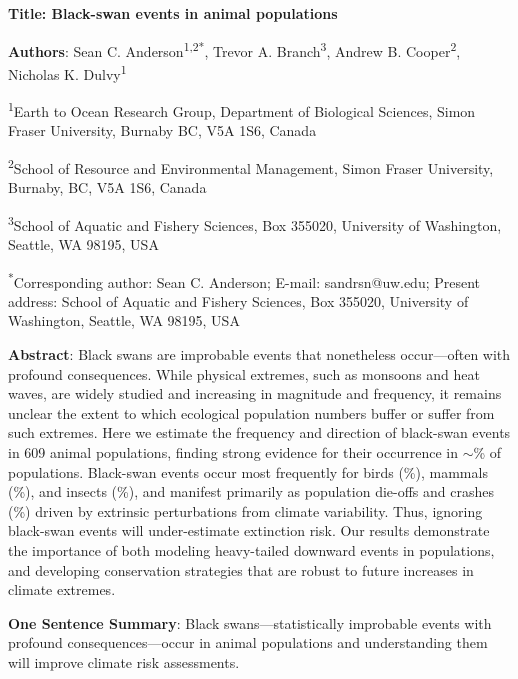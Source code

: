 \textbf{Title: Black-swan events in animal populations}

\textbf{Authors}: Sean C. Anderson\textsuperscript{1,2*}, Trevor A. Branch\textsuperscript{3}, Andrew B. Cooper\textsuperscript{2}, Nicholas K. Dulvy\textsuperscript{1}

\textsuperscript{1}Earth to Ocean Research Group, Department of Biological Sciences, Simon Fraser University, Burnaby BC, V5A 1S6, Canada

\textsuperscript{2}School of Resource and Environmental Management, Simon Fraser University, Burnaby, BC, V5A 1S6, Canada

\textsuperscript{3}School of Aquatic and Fishery Sciences, Box 355020, University of Washington, Seattle, WA 98195, USA

\textsuperscript{*}Corresponding author: Sean C. Anderson; E-mail: sandrsn@uw.edu; Present address: School of Aquatic and Fishery Sciences, Box 355020, University of Washington, Seattle, WA 98195, USA


\textbf{Abstract}:
Black swans are improbable events that nonetheless occur---often with profound consequences. While physical extremes, such as monsoons and heat waves, are widely studied and increasing in magnitude and frequency, it remains unclear the extent to which ecological population numbers buffer or suffer from such extremes. Here we estimate the frequency and direction of black-swan events in 609 animal populations, finding strong evidence for their occurrence in \(\sim\)\overallBasePerc \% of populations. Black-swan events occur most frequently for birds (\birdPH \%), mammals (\mammalsPH \%), and insects (\insectsPH \%), and manifest primarily as   population die-offs and crashes (\percBSDown \%) driven by extrinsic perturbations from climate variability. Thus, ignoring black-swan events will under-estimate extinction risk. Our results demonstrate the importance of both modeling heavy-tailed downward events in populations, and developing conservation strategies that are robust to future increases in climate extremes.

\textbf{One Sentence Summary}: Black swans---statistically improbable events with profound consequences---occur in animal populations and understanding them will improve climate risk assessments.


